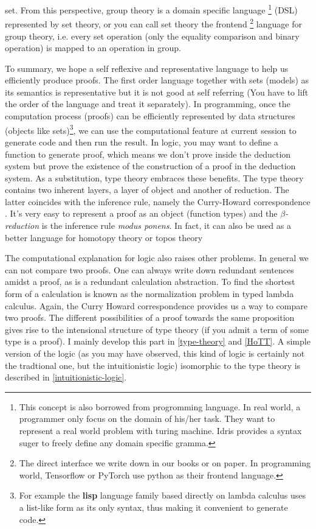 set. From this perspective, group theory is a domain specific language
\footnote{This concept is also borrowed from progromming language.
In real world, a programmer only focus on the domain of his/her task.
They want to represent a real world problem with turing machine. Idris
provides a syntax suger to freely define any domain specific gramma.} 
(DSL) represented by set theory, or you can call set theory the frontend 
\footnote{The direct interface we write down in our books or on paper. 
In programming world, Tensorflow or PyTorch use python as their frontend 
language.} language for group theory, i.e. every set operation (only the 
equality comparison and binary operation) is mapped to an operation in 
group. 

To summary, we hope a self reflexive and representative language to
help us efficiently produce proofs. The first order language together 
with sets (models) as its semantics is representative but it is not good 
at self referring (You have to lift the order of the language and treat 
it separately). In programming, once the computation process (proofs) can 
be efficiently represented by data structures (objects like sets)\footnote{
    For example the {\bf lisp} language family based directly on lambda
    calculus uses a list-like form as its only syntax, thus making it
    convenient to generate code.
}, we can use the computational feature at current session to generate
code and then run the result. In logic, you may want to define a function
to generate proof, which means we don't prove inside the deduction system
but prove the existence of the construction of a proof in the deduction
system. As a substitution, type theory embraces these benefits. 
The type theory contains two inherent layers, a layer of object and
another of reduction. The latter coincides with the inference rule,
namely the Curry-Howard correspondence \cite{Curry-Howard,
intuitionistic-type-theory}. It's very easy to represent a proof as an
object (function types) and the {\it $\beta$-reduction} is the inference
rule {\it modus ponens}. In fact, it can also be used as a better language
for homotopy theory \cite{homotopy-type-theory} or topos theory
\cite{Introduction-to-higher-order-categorical-logic,categorical-logic-and-type-theory}

The computational explanation for logic also raises other problems.
In general we can not compare two proofs. One can always write down
redundant sentences amidst a proof, as is a redundant calculation
abstraction. To find the shortest form of a calculation is known as
the normalization problem in typed lambda calculus\cite{Curry-Howard}.
Again, the Curry Howard correspondence provides us a way to compare two
proofs. The different possibilities of a proof towards the same proposition
gives rise to the intensional structure of type theory (if you admit a
term of some type is a proof). I mainly develop this part in 
\autoref{type-theory} and \autoref{HoTT}. A simple version of the logic
(as you may have observed, this kind of logic is certainly not the
tradtional one, but the intuitionistic logic) isomorphic to the type
theory is described in \autoref{intuitionistic-logic}.

